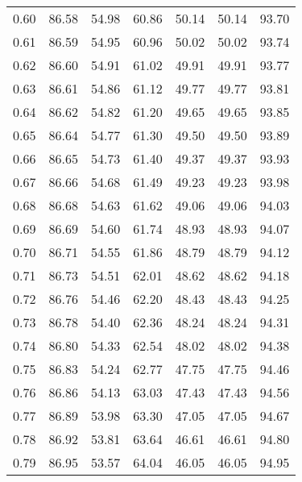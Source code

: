 \begin{tabular}{|c|c|c|c|c|c|c|}
      0.60 &     86.58 &     54.98 &      60.86 &   50.14 &      50.14 &         93.70 \\
      0.61 &     86.59 &     54.95 &      60.96 &   50.02 &      50.02 &         93.74 \\
      0.62 &     86.60 &     54.91 &      61.02 &   49.91 &      49.91 &         93.77 \\
      0.63 &     86.61 &     54.86 &      61.12 &   49.77 &      49.77 &         93.81 \\
      0.64 &     86.62 &     54.82 &      61.20 &   49.65 &      49.65 &         93.85 \\
      0.65 &     86.64 &     54.77 &      61.30 &   49.50 &      49.50 &         93.89 \\
      0.66 &     86.65 &     54.73 &      61.40 &   49.37 &      49.37 &         93.93 \\
      0.67 &     86.66 &     54.68 &      61.49 &   49.23 &      49.23 &         93.98 \\
      0.68 &     86.68 &     54.63 &      61.62 &   49.06 &      49.06 &         94.03 \\
      0.69 &     86.69 &     54.60 &      61.74 &   48.93 &      48.93 &         94.07 \\
      0.70 &     86.71 &     54.55 &      61.86 &   48.79 &      48.79 &         94.12 \\
      0.71 &     86.73 &     54.51 &      62.01 &   48.62 &      48.62 &         94.18 \\
      0.72 &     86.76 &     54.46 &      62.20 &   48.43 &      48.43 &         94.25 \\
      0.73 &     86.78 &     54.40 &      62.36 &   48.24 &      48.24 &         94.31 \\
      0.74 &     86.80 &     54.33 &      62.54 &   48.02 &      48.02 &         94.38 \\
      0.75 &     86.83 &     54.24 &      62.77 &   47.75 &      47.75 &         94.46 \\
      0.76 &     86.86 &     54.13 &      63.03 &   47.43 &      47.43 &         94.56 \\
      0.77 &     86.89 &     53.98 &      63.30 &   47.05 &      47.05 &         94.67 \\
      0.78 &     86.92 &     53.81 &      63.64 &   46.61 &      46.61 &         94.80 \\
      0.79 &     86.95 &     53.57 &      64.04 &   46.05 &      46.05 &         94.95 \\

\end{tabular}
